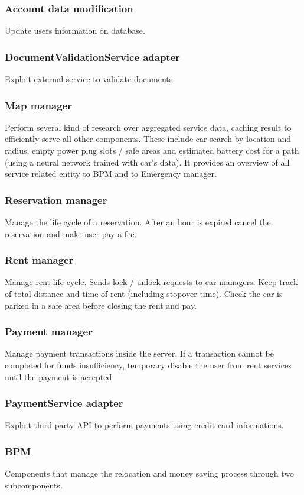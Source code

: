 \documentclass[english]{article}
\begin{document}
		\subsubsection{Account data modification }
		Update users information on database.
	\subsubsection{DocumentValidationService adapter}
	Exploit external service to validate documents.
	
	\subsubsection{Map manager}
	Perform several kind of research over aggregated service data, caching result to efficiently serve all other components. These include car search by location and radius, empty power plug slots / safe areas and estimated battery cost for a path (using a neural network trained with car's data).  It provides an overview of all service related entity to BPM and to Emergency manager.
	\subsubsection{Reservation manager}
	Manage the life cycle of a reservation. After an hour is expired cancel the reservation and make user pay a fee.
	\subsubsection{Rent manager}
	Manage rent life cycle. Sends lock / unlock requests to car managers. Keep track of total distance and time of rent (including stopover time).  Check the car is parked in a safe area before closing the rent and pay.
	
	\subsubsection{Payment manager}
	Manage payment transactions inside the server. If a transaction cannot be completed for funds insufficiency, temporary disable the user from rent services until the payment is accepted.
	\subsubsection{PaymentService adapter}
	Exploit third party API to perform payments using credit card informations.
	\subsubsection{BPM}
	Components that manage the relocation and money saving process through two subcomponents.
\end{document}
